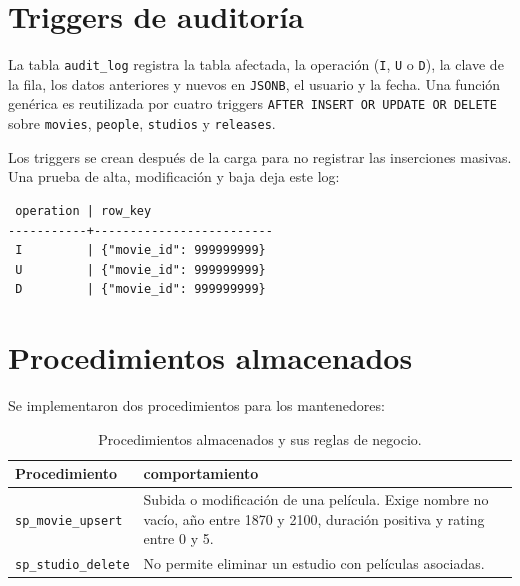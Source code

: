 \documentclass[11pt,a4paper]{article}
\begin{document}
\section{Triggers de auditoría}

La tabla \texttt{audit\_log} registra la tabla afectada, la operación
(\texttt{I}, \texttt{U} o \texttt{D}), la clave de la fila, los datos anteriores
y nuevos en \texttt{JSONB}, el usuario y la fecha. Una función genérica es
reutilizada por cuatro triggers \texttt{AFTER INSERT OR UPDATE OR DELETE} sobre
\texttt{movies}, \texttt{people}, \texttt{studios} y \texttt{releases}.

Los triggers se crean después de la carga para no registrar las inserciones
masivas. Una prueba de alta, modificación y baja deja este log:

\begin{verbatim}
 operation | row_key
-----------+-------------------------
 I         | {"movie_id": 999999999}
 U         | {"movie_id": 999999999}
 D         | {"movie_id": 999999999}
\end{verbatim}

\section{Procedimientos almacenados}

Se implementaron dos procedimientos para los mantenedores:

\begin{table}[htbp]
    \centering
    \begin{tabular}{p{4.3cm} p{9.5cm}}
        \hline
        Procedimiento & comportamiento \\
        \hline
        \texttt{sp\_movie\_upsert} &
        Subida o modificación de una película. Exige nombre no vacío, año entre
        1870 y 2100, duración positiva y rating entre 0 y 5. \\
        \texttt{sp\_studio\_delete} &
        No permite eliminar un estudio con películas asociadas. \\
        \hline
    \end{tabular}
    \caption{Procedimientos almacenados y sus reglas de negocio.}
    \label{tab:procedimientos}
\end{table}
\end{document}
